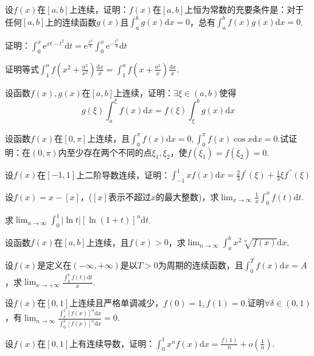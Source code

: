 \begin{xiti}
\item 设$f(x)$在$[a,b]$上连续，证明：$f(x)$在$[a,b]$上恒为常数的充要条件是：对于任何$[a,b]$上的连续函数$g(x)$且$\int _ { a } ^ { b } g ( x ) \mathrm { d } x = 0$，总有$\int _ { a } ^ { b } f ( x ) g ( x ) \mathrm { d } x = 0$.
\item 证明：$\int _ { 0 } ^ { x } \mathrm { e } ^ { x t - t ^ { 2 } } \mathrm { d } t = \mathrm { e } ^ { \frac { x ^ { 2 } } { 4 } } \int _ { 0 } ^ { x } \mathrm { e } ^ { - \frac { t ^ { 2 } } { 4 } } \mathrm { d } t$
\item 证明等式$\int _ { 1 } ^ { a } f \left( x ^ { 2 } + \frac { a ^ { 2 } } { x ^ { 2 } } \right) \frac { \mathrm { d } x } { x } = \int _ { 1 } ^ { a } f \left( x + \frac { a ^ { 2 } } { x } \right) \frac { \mathrm { d } x } { x }$.
\item 设函数$f(x),g(x)$在$[a,b]$上连续，证明：$\exists \xi \in (a,b)$使得
\[g ( \xi ) \int _ { a } ^ { \xi } f ( x ) \mathrm { d } x = f ( \xi ) \int _ { \xi } ^ { b } g ( x ) \mathrm { d } x\]
\item 设函数$f(x)$在$[0,\pi ]$上连续，且$\int _ { 0 } ^ { \pi } f ( x ) \mathrm { d } x = 0 , \int _ { 0 } ^ { \pi } f ( x ) \cos x \mathrm { d } x = 0$.试证明：在$(0,\pi )$内至少存在两个不同的点$\xi_{ 1 },\xi_{ 2 }$，使$f(\xi_{ 1 })=f(\xi_{ 2 })=0$.
\item 设$f(x)$在$[-1,1]$上二阶导数连续，证明：$\int _ { - 1 } ^ { 1 } x f ( x ) \mathrm { d } x = \frac { 2 } { 3 } f ^ { \prime } ( \xi ) + \frac { 1 } { 3 } \xi f ^ { \prime \prime } ( \xi )$
\item 设$f(x)=x-[x]$，($[x]$表示不超过$x$的最大整数)，求$\lim _ { x \rightarrow \infty } \frac { 1 } { x } \int _ { 0 } ^ { x } f ( t ) \mathrm { d } t$.
\item 求$\lim _ { n \rightarrow \infty } \int _ { 0 } ^ { 1 } | \ln t | [ \ln ( 1 + t ) ] ^ { n } \mathrm { d } t$.
\item 设函数$f(x)$在$[a,b]$上连续，且$f(x)>0$，求$\lim _ { n \rightarrow \infty } \int _ { a } ^ { b } x ^ { 2 } \sqrt [ n ] { f ( x ) } \mathrm { d } x$.
\item 设$f(x)$是定义在$(-\infty,+\infty)$是以$T>0$为周期的连续函数，且$\int_{0}^{T} f(x) \mathrm{d} x=A$，求$\lim _{x \rightarrow+\infty} \frac{\int_{a}^{b} f(t) \mathrm{d} t}{x}$.
\item 设$f(x)$在$[0,1]$上连续且严格单调减少，$f(0)=1,f(1)=0$.证明$\forall \delta \in(0,1)$，有$\lim _{n \rightarrow \infty} \frac{\int_{\delta}^{1}[f(x)]^{n} \mathrm{d} x}{\int_{0}^{\delta}[f(x)]^{n} \mathrm{d} x}=0$.
\item 设$f(x)$在$[0,1]$上有连续导数，证明：$\int_{0}^{1} x^{n} f(x) \mathrm{d} x=\frac{f(1)}{n}+o\left(\frac{1}{n}\right)$.

\end{xiti}
